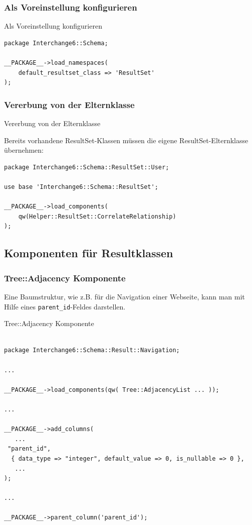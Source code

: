 \subsubsection{Als Voreinstellung konfigurieren}

\begin{frame}[fragile]{Als Voreinstellung konfigurieren}
\begin{lstlisting}
package Interchange6::Schema;

__PACKAGE__->load_namespaces(
    default_resultset_class => 'ResultSet'
);

\end{lstlisting}
\end{frame}

\subsubsection{Vererbung von der Elternklasse}
\begin{frame}[fragile]{Vererbung von der Elternklasse}

Bereits vorhandene ResultSet-Klassen müssen die eigene
ResultSet-Elternklasse übernehmen:

\begin{lstlisting}
package Interchange6::Schema::ResultSet::User;

use base 'Interchange6::Schema::ResultSet';

__PACKAGE__->load_components(
    qw(Helper::ResultSet::CorrelateRelationship)
);
\end{lstlisting}
\end{frame}

\subsection{Komponenten für Resultklassen}

\subsubsection{Tree::Adjacency Komponente}

Eine Baumstruktur, wie z.B. für die Navigation einer
Webseite, kann man mit Hilfe eines \verb|parent_id|-Feldes
darstellen.

\begin{frame}[fragile]{Tree::Adjacency Komponente}
\begin{lstlisting}

package Interchange6::Schema::Result::Navigation;

...

__PACKAGE__->load_components(qw( Tree::AdjacencyList ... ));

...

__PACKAGE__->add_columns(
   ...
 "parent_id",
  { data_type => "integer", default_value => 0, is_nullable => 0 },
   ...
);

...

__PACKAGE__->parent_column('parent_id');

\end{lstlisting}
\end{frame}


